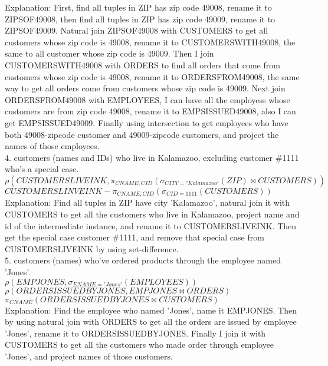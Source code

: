 \documentclass[12pt,a4paper]{amsart}
\begin{document}
Explanation: First, find all tuples in ZIP has zip code 49008, rename it to ZIPSOF49008, then find all tuples in ZIP has zip code 49009, rename it to ZIPSOF49009. Natural join ZIPSOF49008 with CUSTOMERS to get all customers whose zip code is 49008, rename it to CUSTOMERSWITH49008, the same to all customer whose zip code is 49009. Then I join CUSTOMERSWITH49008 with ORDERS to find all orders that come from customers whose zip code is 49008, rename it to ORDERSFROM49008, the same way to get all orders come from customers whose zip code is 49009. Next join ORDERSFROM49008 with EMPLOYEES, I can have all the employess whose customers are from zip code 49008, rename it to EMPSISSUED49008, also I can get EMPSISSUED49009. Finally using intersection to get employees who have both 49008-zipcode customer and 49009-zipcode customers, and project the names of those employees. \\

4. customers (names and IDs) who live in Kalamazoo, excluding customer \#1111 who's a special case. \\
$\rho (CUSTOMERSLIVEINK, \pi_{CNAME, CID}(\sigma_{CITY='Kalamazoo'}(ZIP) \Join CUSTOMERS)) $ \\
$CUSTOMERSLINVEINK - \pi_{CNAME, CID}(\sigma_{CID=1111}(CUSTOMERS))$ \\

Explanation: Find all tuples in ZIP have city 'Kalamazoo', natural join it with CUSTOMERS to get all the customers who live in Kalamazoo, project name and id of the intermediate instance, and rename it to CUSTOMERSLIVEINK. Then get the special case customer \#1111, and remove that special case from CUSTOMERSLIVEINK by using set-difference. \\

5. customers (names) who've ordered products through the employee named 'Jones'. \\
$\rho (EMPJONES, \sigma_{ENAME='Jones'}(EMPLOYEES))$ \\
$\rho (ORDERSISSUEDBYJONES, EMPJONES \Join ORDERS) $ \\
$\pi_{CNAME} (ORDERSISSUEDBYJONES \Join CUSTOMERS) $ \\

Explanation: Find the employee who named 'Jones', name it EMPJONES. Then by using natural join with ORDERS to get all the orders are issued by employee 'Jones', rename it to ORDERSISSUEDBYJONES. Finally I join it with CUSTOMERS to get all the customers who made order through employee 'Jones', and project names of those customers. \\
\end{document}
